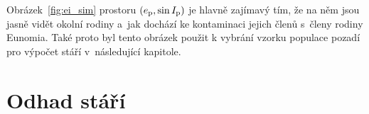 \documentclass[A4paper, 12pt, oneside]{book}
\begin{document}
Obrázek~\ref{fig:ei_sim} prostoru $(e_{\rm p},\sin I_{\rm p})$ je hlavně zajímavý tím, že na něm jsou jasně vidět okolní rodiny a~jak dochází ke kontaminaci jejich členů s~členy rodiny Eunomia. Také proto byl tento obrázek použit k vybrání vzorku populace pozadí pro výpočet stáří v~následující kapitole.

\section{Odhad stáří}

\immediate{}
\immediate{}
\immediate{}
\immediate{}
\end{document}
